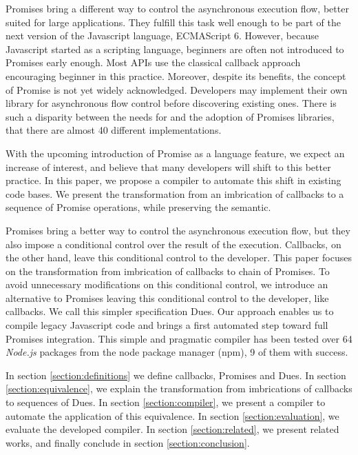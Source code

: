 Promises bring a different way to control the asynchronous execution flow, better suited for large applications.
They fulfill this task well enough to be part of the next version of the Javascript language, ECMAScript 6.
However, because Javascript started as a scripting language, beginners are often not introduced to Promises early enough.
Most APIs use the classical callback approach encouraging beginner in this practice.
Moreover, despite its benefits, the concept of Promise is not yet widely acknowledged.
Developers may implement their own library for asynchronous flow control before discovering existing ones.
There is such a disparity between the needs for and the adoption of Promises libraries, that there are almost 40 different implementations.

With the upcoming introduction of Promise as a language feature, we expect an increase of interest, and believe that many developers will shift to this better practice.
In this paper, we propose a compiler to automate this shift in existing code bases.
We present the transformation from an imbrication of callbacks to a sequence of Promise operations, while preserving the semantic.

Promises bring a better way to control the asynchronous execution flow, but they also impose a conditional control over the result of the execution.
Callbacks, on the other hand, leave this conditional control to the developer.
This paper focuses on the transformation from imbrication of callbacks to chain of Promises.
To avoid unnecessary modifications on this conditional control, we introduce an alternative to Promises leaving this conditional control to the developer, like callbacks.
We call this simpler specification Dues.
Our approach enables us to compile legacy Javascript code and brings a first automated step toward full Promises integration.
This simple and pragmatic compiler has been tested over 64 \textit{Node.js} packages from the node package manager (npm), 9 of them with success.

In section \ref{section:definitions} we define callbacks, Promises and Dues.
In section \ref{section:equivalence}, we explain the transformation from imbrications of callbacks to sequences of Dues.
In section \ref{section:compiler}, we present a compiler to automate the application of this equivalence.
In section \ref{section:evaluation}, we evaluate the developed compiler.
In section \ref{section:related}, we present related works, and finally conclude in section \ref{section:conclusion}.